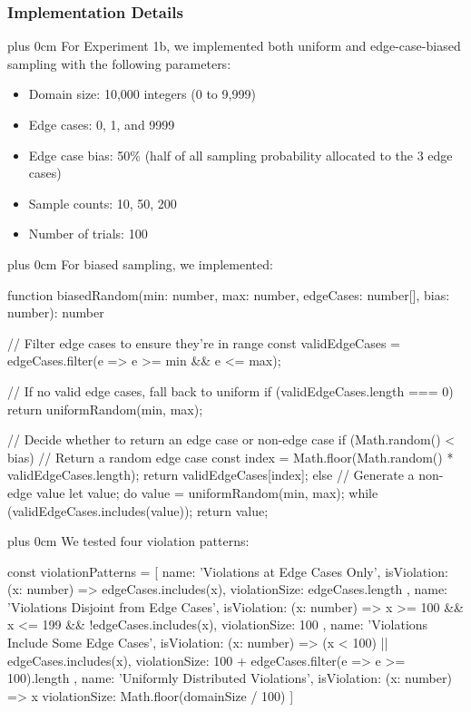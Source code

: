 \documentclass[11pt,a4paper]{article}
\newcommand{\justifytext}{\leftskip=0pt \rightskip=0pt plus 0cm}
\begin{document}
\subsubsection{Implementation Details}

\justifytext
For Experiment 1b, we implemented both uniform and edge-case-biased sampling with the following parameters:

\begin{itemize}
\item Domain size: 10,000 integers (0 to 9,999)
\item Edge cases: 0, 1, and 9999
\item Edge case bias: 50\% (half of all sampling probability allocated to the 3 edge cases)
\item Sample counts: 10, 50, 200
\item Number of trials: 100
\end{itemize}

\justifytext
For biased sampling, we implemented:

\begin{wrappedcode}
function biasedRandom(min: number, max: number, edgeCases: number[], bias: number): number {
  // Filter edge cases to ensure they're in range
  const validEdgeCases = edgeCases.filter(e => e >= min && e <= max);
  
  // If no valid edge cases, fall back to uniform
  if (validEdgeCases.length === 0) {
    return uniformRandom(min, max);
  }
  
  // Decide whether to return an edge case or non-edge case
  if (Math.random() < bias) {
    // Return a random edge case
    const index = Math.floor(Math.random() * validEdgeCases.length);
    return validEdgeCases[index];
  } else {
    // Generate a non-edge value
    let value;
    do {
      value = uniformRandom(min, max);
    } while (validEdgeCases.includes(value));
    return value;
  }
}
\end{wrappedcode}

\justifytext
We tested four violation patterns:

\begin{wrappedcode}
const violationPatterns = [
  { 
    name: 'Violations at Edge Cases Only',
    isViolation: (x: number) => edgeCases.includes(x),
    violationSize: edgeCases.length
  },
  { 
    name: 'Violations Disjoint from Edge Cases',
    isViolation: (x: number) => x >= 100 && x <= 199 && !edgeCases.includes(x),
    violationSize: 100
  },
  { 
    name: 'Violations Include Some Edge Cases',
    isViolation: (x: number) => (x < 100) || edgeCases.includes(x),
    violationSize: 100 + edgeCases.filter(e => e >= 100).length
  },
  { 
    name: 'Uniformly Distributed Violations',
    isViolation: (x: number) => x %
    violationSize: Math.floor(domainSize / 100)
  }
]
\end{wrappedcode}
\end{document}
